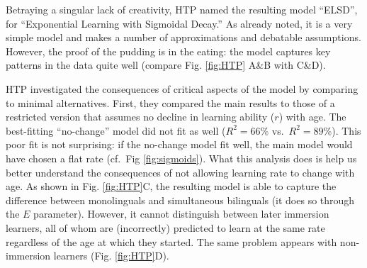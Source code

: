 \documentclass[
  english,
  doc,floatsintext]{apa6}
\begin{document}
Betraying a singular lack of creativity, HTP named the resulting model ``ELSD'', for ``Exponential Learning with Sigmoidal Decay.'' As already noted, it is a very simple model and makes a number of approximations and debatable assumptions. However, the proof of the pudding is in the eating: the model captures key patterns in the data quite well (compare Fig. \ref{fig:HTP} A\&B with C\&D).

HTP investigated the consequences of critical aspects of the model by comparing to minimal alternatives. First, they compared the main results to those of a restricted version that assumes no decline in learning ability (\(r\)) with age. The best-fitting ``no-change'' model did not fit as well (\(R^2=66\)\% vs.~\(R^2=89\)\%). This poor fit is not surprising: if the no-change model fit well, the main model would have chosen a flat rate (cf.~Fig \ref{fig:sigmoids}). What this analysis does is help us better understand the consequences of not allowing learning rate to change with age. As shown in Fig. \ref{fig:HTP}C, the resulting model is able to capture the difference between monolinguals and simultaneous bilinguals (it does so through the \(E\) parameter). However, it cannot distinguish between later immersion learners, all of whom are (incorrectly) predicted to learn at the same rate regardless of the age at which they started. The same problem appears with non-immersion learners (Fig. \ref{fig:HTP}D).
\end{document}

